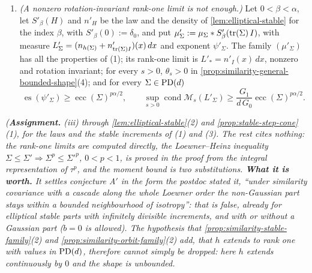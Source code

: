 \begin{proposition}
\begin{enumerate}
$\operatorname{es}(\psi_\Sigma) = \operatorname{ecc}(\Sigma)^{p\alpha/2}$, $\operatorname{rs}(L_\Sigma) \ge \operatorname{ecc}(\Sigma)^{p\alpha/2}$, and for
every $s > 0$
\[
  \operatorname{cond}\mathcal M_s(L_\Sigma) \ge \frac{G_1}{d\,G_0}\operatorname{ecc}(\Sigma)^{p\alpha/2} ,
\]
\[
  G_0 := \int_{\RR^d}(z_d^2 \wedge 1)\,|z|^{-d-\alpha}\,dz ,
  \quad
  G_1 := \int_{\RR^d}(|z|^2 \wedge 1)\,|z|^{-d-\alpha}\,dz ,
\]
both finite and positive. The rank-one limit of \ref{prop:similarity-general-sandwich}(4) is $L_* = 0$.
\item \emph{(A nonzero rotation-invariant rank-one limit is not enough.)} Let $0 < \beta < \alpha$, let
$S'_\beta(H)$ and $n'_H$ be the law and the \Levy{} density of \ref{lem:elliptical-stable} for the index
$\beta$, with $S'_\beta(0) := \delta_0$, and put $\mu'_\Sigma := \mu_\Sigma * S'_\beta(\operatorname{tr}(\Sigma)\,I)$, with \Levy{} measure
$L'_\Sigma = (n_{h(\Sigma)} + n'_{\operatorname{tr}(\Sigma)I})(x)\,dx$ and exponent $\psi'_\Sigma$. The family $(\mu'_\Sigma)$
has all the properties of (1); its rank-one limit is $L'_* = n'_I(x)\,dx$, nonzero and rotation
invariant; for every $s > 0$, $\theta_s > 0$ in \ref{prop:similarity-general-bounded-shape}(4); and for
every $\Sigma \in \mathrm{PD}(d)$
\[
  \operatorname{es}(\psi'_\Sigma) \ge \operatorname{ecc}(\Sigma)^{p\alpha/2} ,
  \qquad
  \sup_{s>0}\operatorname{cond}\mathcal M_s(L'_\Sigma) \ge \frac{G_1}{d\,G_0}\operatorname{ecc}(\Sigma)^{p\alpha/2} .
\]
\end{enumerate}
\statusA\quad{}\quad\emph{(\textbf{Assignment.} (iii) through
\ref{lem:elliptical-stable}(2) and \ref{prop:stable-step-cone}(1), for the laws and the stable
increments of (1) and (3). The rest cites nothing: the rank-one limits are computed directly, the
Loewner--Heinz inequality $\Sigma \le \Sigma' \Rightarrow
\Sigma^p \le \Sigma'^p$, $0 < p < 1$, is proved in the proof from the integral representation of
$\tau^p$, and the moment bound is two substitutions. \textbf{What it is worth.} It settles conjecture
A$'$ in the form the postdoc stated it, ``under similarity covariance with a cascade along the whole
Loewner order the non-Gaussian part stays within a bounded neighbourhood of isotropy'': that is
false, already for elliptical stable parts with infinitely divisible increments, and with or without
a Gaussian part ($b = 0$ is allowed). The hypothesis that \ref{prop:similarity-stable-family}(2) and
\ref{prop:similarity-orbit-family}(2) add, that $h$ extends to rank one with values in $\mathrm{PD}(d)$,
therefore cannot simply be dropped: here $h$ extends continuously by $0$ and the shape is unbounded.
}
\end{proposition}
